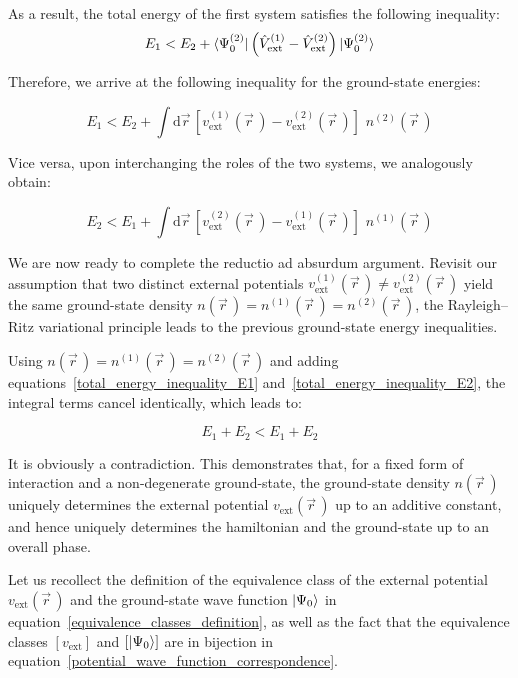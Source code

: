 As a result, the total energy of the first system satisfies the following inequality:
\begin{equation}
    E_1<E_2+\bra{\Psi_0^{(2)}}\left(\hat{V}_\mathrm{ext}^{(1)}-\hat{V}_\mathrm{ext}^{(2)}\right)\ket{\Psi_0^{(2)}}
\end{equation}

Therefore, we arrive at the following inequality for the ground-state energies:

\begin{equation}
    E_1<E_2+\int \mathrm{d}\vec{r}\,\left[v_\mathrm{ext}^{(1)}(\vec{r}\,)-v_\mathrm{ext}^{(2)}(\vec{r}\,)\right]\,\,n^{(2)}(\vec{r}\,)
\label{total_energy_inequality_E1}
\end{equation}

Vice versa, upon interchanging the roles of the two systems, we analogously obtain:

\begin{equation}
    E_2<E_1+\int \mathrm{d}\vec{r}\,\left[v_\mathrm{ext}^{(2)}(\vec{r}\,)-v_\mathrm{ext}^{(1)}(\vec{r}\,)\right]\,\,n^{(1)}(\vec{r}\,)
\label{total_energy_inequality_E2}
\end{equation}

We are now ready to complete the reductio ad absurdum argument.
Revisit our assumption that two distinct external potentials $v_\mathrm{ext}^{(1)}(\vec{r}\,)\neq v_\mathrm{ext}^{(2)}(\vec{r}\,)$ yield the same ground-state density $n(\vec{r}\,)=n^{(1)}(\vec{r}\,)=n^{(2)}(\vec{r}\,)$, the Rayleigh--Ritz variational principle leads to the previous ground-state energy inequalities.

Using $n(\vec{r}\,)=n^{(1)}(\vec{r}\,) = n^{(2)}(\vec{r}\,)$ and adding equations~\eqref{total_energy_inequality_E1}
and~\eqref{total_energy_inequality_E2}, the integral terms cancel identically, which leads to:

\begin{equation}
    E_1 + E_2 < E_1 + E_2
\label{total_energy_inequality_contradiction}
\end{equation}

It is obviously a contradiction.
This demonstrates that, for a fixed form of interaction and a non-degenerate ground-state,
the ground-state density $n(\vec{r}\,)$ uniquely determines the external potential $v_\mathrm{ext}(\vec{r}\,)$ up to an additive constant,
and hence uniquely determines the hamiltonian and the ground-state up to an overall phase.

Let us recollect the definition of the equivalence class of the external potential $v_\mathrm{ext}(\vec{r}\,)$ and the ground-state wave function $\ket{\Psi_0}$ in equation~\eqref{equivalence_classes_definition},
as well as the fact that the equivalence classes $\left[v_\mathrm{ext}\right]$ and $\left[\ket{\Psi_0}\right]$ are in bijection in equation~\eqref{potential_wave_function_correspondence}.

